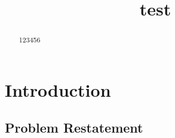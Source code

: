 \documentclass{mcmthesis}
\title{test}
\numberwithin{figure}{section}
\numberwithin{table}{section}
\numberwithin{equation}{section}
\begin{document}
\begin{abstract}



\begin{keywords}
123456
\end{keywords}
\end{abstract}
\maketitle

\tableofcontents
  \thispagestyle{empty}
  \newpage
  \setcounter{page}{1}

\section{Introduction}

\subsection{Problem Restatement}
\end{document}
